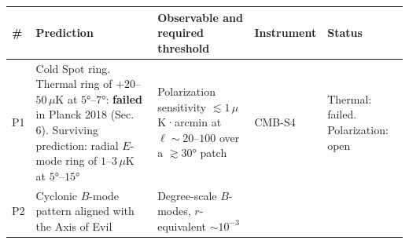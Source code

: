\documentclass[
]{article}
\begin{document}
\begin{longtable}[]{@{}lllll@{}}
\toprule
\begin{minipage}[b]{0.11\columnwidth}\raggedright
\#\strut
\end{minipage} & \begin{minipage}[b]{0.19\columnwidth}\raggedright
Prediction\strut
\end{minipage} & \begin{minipage}[b]{0.19\columnwidth}\raggedright
Observable and required threshold\strut
\end{minipage} & \begin{minipage}[b]{0.19\columnwidth}\raggedright
Instrument\strut
\end{minipage} & \begin{minipage}[b]{0.19\columnwidth}\raggedright
Status\strut
\end{minipage}\tabularnewline
\midrule
\endhead
\begin{minipage}[t]{0.11\columnwidth}\raggedright
P1\strut
\end{minipage} & \begin{minipage}[t]{0.19\columnwidth}\raggedright
Cold Spot ring. Thermal ring of \(+20\)--\(50\,\mu\)K at \(5°\)--\(7°\):
\textbf{failed} in Planck 2018 (Sec. 6). Surviving prediction: radial
\(E\)-mode ring of \(1\)--\(3\,\mu\)K at \(5°\)--\(15°\)\strut
\end{minipage} & \begin{minipage}[t]{0.19\columnwidth}\raggedright
Polarization sensitivity \(\lesssim 1\,\mu\)K·arcmin at
\(\ell \sim 20\)--\(100\) over a \(\gtrsim 30°\) patch\strut
\end{minipage} & \begin{minipage}[t]{0.19\columnwidth}\raggedright
CMB-S4\strut
\end{minipage} & \begin{minipage}[t]{0.19\columnwidth}\raggedright
Thermal: failed. Polarization: open\strut
\end{minipage}\tabularnewline
\begin{minipage}[t]{0.11\columnwidth}\raggedright
P2\strut
\end{minipage} & \begin{minipage}[t]{0.19\columnwidth}\raggedright
Cyclonic \(B\)-mode pattern aligned with the Axis of Evil\strut
\end{minipage} & \begin{minipage}[t]{0.19\columnwidth}\raggedright
Degree-scale \(B\)-modes, \(r\)-equivalent \(\sim\!10^{-3}\)\strut

\end{minipage}
\end{longtable}
\end{document}
